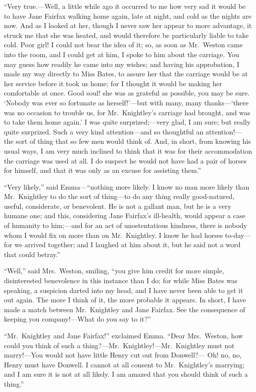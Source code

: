 ``Very true.---Well, a little while ago it occurred to me how very sad
it would be to have Jane Fairfax walking home again, late at night,
and cold as the nights are now.  And as I looked at her, though I
never saw her appear to more advantage, it struck me that she
was heated, and would therefore be particularly liable to take cold.
Poor girl!  I could not bear the idea of it; so, as soon as Mr.\ Weston
came into the room, and I could get at him, I spoke to him about
the carriage.  You may guess how readily he came into my wishes;
and having his approbation, I made my way directly to Miss Bates,
to assure her that the carriage would be at her service before it took
us home; for I thought it would be making her comfortable at once.
Good soul! she was as grateful as possible, you may be sure.
`Nobody was ever so fortunate as herself!'---but with many,
many thanks---`there was no occasion to trouble us, for Mr.\ Knightley's
carriage had brought, and was to take them home again.'  I was
quite surprized;---very glad, I am sure; but really quite surprized.
Such a very kind attention---and so thoughtful an attention!---%
the sort of thing that so few men would think of.  And, in short,
from knowing his usual ways, I am very much inclined to think
that it was for their accommodation the carriage was used at all.
I do suspect he would not have had a pair of horses for himself,
and that it was only as an excuse for assisting them.''

``Very likely,'' said Emma---``nothing more likely.  I know no man
more likely than Mr.\ Knightley to do the sort of thing---to do any
thing really good-natured, useful, considerate, or benevolent.
He is not a gallant man, but he is a very humane one; and this,
considering Jane Fairfax's ill-health, would appear a case
of humanity to him;---and for an act of unostentatious kindness,
there is nobody whom I would fix on more than on Mr.\ Knightley.
I know he had horses to-day---for we arrived together; and I laughed at
him about it, but he said not a word that could betray.''

``Well,'' said Mrs.\ Weston, smiling, ``you give him credit for
more simple, disinterested benevolence in this instance than I do;
for while Miss Bates was speaking, a suspicion darted into my head,
and I have never been able to get it out again.  The more I think
of it, the more probable it appears.  In short, I have made a match
between Mr.\ Knightley and Jane Fairfax.  See the consequence
of keeping you company!---What do you say to it?''

``Mr.\ Knightley and Jane Fairfax!'' exclaimed Emma.  ``Dear Mrs.\ Weston,
how could you think of such a thing?---Mr.\ Knightley!---Mr.\ Knightley
must not marry!---You would not have little Henry cut out from Donwell?---%
Oh! no, no, Henry must have Donwell.  I cannot at all consent to
Mr.\ Knightley's marrying; and I am sure it is not at all likely.
I am amazed that you should think of such a thing.''

